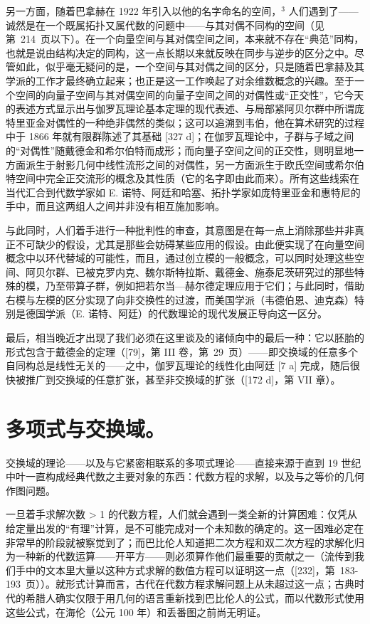 另一方面，随着巴拿赫在 1922 年引入以他的名字命名的空间，\(^{3}\) 人们遇到了——诚然是在一个既属拓扑又属代数的问题中——与其对偶不同构的空间（见第~214~页以下）。在一个向量空间与其对偶空间之间，本来就不存在“典范”同构，也就是说由结构决定的同构，这一点长期以来就反映在同步与逆步的区分之中。尽管如此，似乎毫无疑问的是，一个空间与其对偶之间的区分，只是随着巴拿赫及其学派的工作才最终确立起来；也正是这一工作唤起了对余维数概念的兴趣。至于一个空间的向量子空间与其对偶空间的向量子空间之间的对偶性或“正交性”，它今天的表述方式显示出与伽罗瓦理论基本定理的现代表述、与局部紧阿贝尔群中所谓庞特里亚金对偶性的一种绝非偶然的类似；这可以追溯到韦伯，他在算术研究的过程中于 1866 年就有限群陈述了其基础 {[}327 d{]}；在伽罗瓦理论中，子群与子域之间的“对偶性”随戴德金和希尔伯特而成形；而向量子空间之间的正交性，则明显地一方面派生于射影几何中线性流形之间的对偶性，另一方面派生于欧氏空间或希尔伯特空间中完全正交流形的概念及其性质（它的名字即由此而来）。所有这些线索在当代汇合到代数学家如 E. 诺特、阿廷和哈塞、拓扑学家如庞特里亚金和惠特尼的手中，而且这两组人之间并非没有相互施加影响。

与此同时，人们着手进行一种批判性的审查，其意图是在每一点上消除那些并非真正不可缺少的假设，尤其是那些会妨碍某些应用的假设。由此便实现了在向量空间概念中以环代替域的可能性，而且，通过创立模的一般概念，可以同时处理这些空间、阿贝尔群、已被克罗内克、魏尔斯特拉斯、戴德金、施泰尼茨研究过的那些特殊的模，乃至带算子群，例如把若尔当—赫尔德定理应用于它们；与此同时，借助右模与左模的区分实现了向非交换性的过渡，而美国学派（韦德伯恩、迪克森）特别是德国学派（E. 诺特、阿廷）的代数理论的现代发展正导向这一区分。

最后，相当晚近才出现了我们必须在这里谈及的诸倾向中的最后一种：它以胚胎的形式包含于戴德金的定理（{[}79{]}，第 III 卷，第~29~页）——即交换域的任意多个自同构总是线性无关的——之中，伽罗瓦理论的线性化由阿廷 {[}7 a{]} 完成，随后很快被推广到交换域的任意扩张，甚至非交换域的扩张（{[}172 d{]}，第 VII 章）。

\chapter{多项式与交换域。}

交换域的理论——以及与它紧密相联系的多项式理论——直接来源于直到 19 世纪中叶一直构成经典代数之主要对象的东西：代数方程的求解，以及与之等价的几何作图问题。

一旦着手求解次数 \textgreater{} 1 的代数方程，人们就会遇到一类全新的计算困难：仅凭从给定量出发的“有理”计算，是不可能完成对一个未知数的确定的。这一困难必定在非常早的阶段就被察觉到了；而巴比伦人知道把二次方程和双二次方程的求解化归为一种新的代数运算——开平方——则必须算作他们最重要的贡献之一（流传到我们手中的文本里大量以这种方式求解的数值方程可以证明这一点（{[}232{]}，第~183-193~页））。就形式计算而言，古代在代数方程求解问题上从未超过这一点；古典时代的希腊人确实仅限于用几何的语言重新找到巴比伦人的公式，而以代数形式使用这些公式，在海伦（公元 100 年）和丢番图之前尚无明证。


